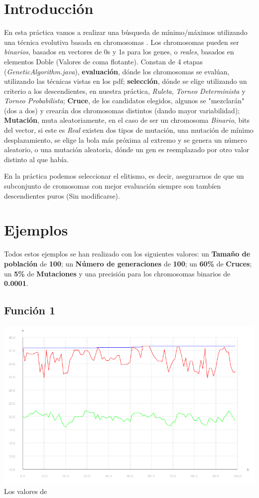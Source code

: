 \documentclass{article}
\begin{document}
\section{Introducción}
En esta práctica vamos a realizar una búsqueda de mínimo/máximos utilizando una técnica evolutiva basada en chromosomas . Los chromosomas pueden ser \textit{binarios}, basados en vectores de 0s y 1s para los genes, o \textit{reales}, basados en elementos Doble (Valores de coma flotante). Constan de 4 etapas (\textit{GeneticAlgorithm.java}), \textbf{evaluación}, dónde los chromosomas se evalúan, utilizando las técnicas vistas en los pdf; \textbf{selección}, dónde se elige utilizando un criterio a los descendientes, en nuestra práctica, \textit{Ruleta}, \textit{Torneo Determinista} y \textit{Torneo Probabilista}; \textbf{Cruce}, de los candidatos elegidos, algunos se "mezclarán" (dos a dos) y crearán dos chromosomas distintos (dando mayor variabilidad); \textbf{Mutación}, muta aleatoriamente, en el caso de ser un chromosoma \textit{Binario}, bits del vector, si este es \textit{Real} existen dos tipos de mutación, una mutación de mínimo desplazamiento, se elige la bola más próxima al extremo y se genera un número aleatorio, o una mutación aleatoria, dónde un gen es reemplazado por otro valor distinto al que había.

En la práctica podemos seleccionar el elitismo, es decir, asegurarnos de que un subconjunto de cromosomas con mejor evaluación siempre son tambíen descendientes puros (Sin modificarse).

\newpage

\section{Ejemplos}
Todos estos ejemplos se han realizado con los siguientes valores: un \textbf{Tamaño de población} de \textbf{100}; un \textbf{Número de generaciones} de \textbf{100}; un \textbf{60\%} de \textbf{Cruces}; un \textbf{5\%} de \textbf{Mutaciones} y una precisión para los chromosomas binarios de \textbf{0.0001}.
\subsection{Función 1}
\includegraphics[scale=0.5]{./images/graph1_bin.png}
Los valores de
\end{document}
